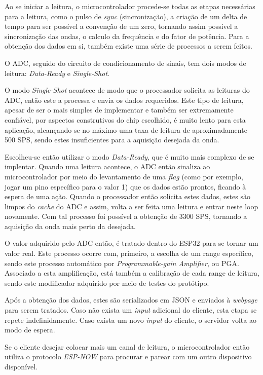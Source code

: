 Ao se iniciar a leitura, o microcontrolador procede-se todas as etapas necessárias para a leitura, como o pulso de \textit{sync} (sincronização), a criação de um delta de tempo para ser possível a convenção de um zero, tornando assim possível a sincronização das ondas, o calculo da frequência e do fator de potência. Para a obtenção dos dados em si, também existe uma série de processos a serem feitos.

O \gls{ADC}, seguido do circuito de condicionamento de sinais, tem dois modos de leitura: \textit{Data-Ready} e \textit{Single-Shot}.

O modo \textit{Single-Shot} acontece de modo que o processador solicita as leituras do \gls{ADC}, então este a processa e envia os dados requeridos. Este tipo de leitura, apesar de ser o mais simples de implementar e também ser extremamente confiável, por aspectos construtivos do chip escolhido, é muito lento para esta aplicação, alcançando-se no máximo uma taxa de leitura de aproximadamente 500 \gls{SPS}, sendo estes insuficientes para a aquisição desejada da onda.

Escolheu-se então utilizar o modo \textit{Data-Ready}, que é muito mais complexo de se implentar. Quando uma leitura acontece, o \gls{ADC} então sinaliza ao microcontrolador por meio do levantamento de uma \textit{flag} (como por exemplo, jogar um pino específico para o valor 1) que os dados estão prontos, ficando à espera de uma ação. Quando o processador então solicita estes dados, estes são limpos do \textit{cache} do \gls{ADC} e assim, volta a ser feita uma leitura e entrar neste loop novamente. Com tal processo foi possível a obtenção de 3300 \gls{SPS}, tornando a aquisição da onda mais perto da desejada.

O valor adquirido pelo ADC então, é tratado dentro do ESP32 para se tornar um valor real. Este processo ocorre com, primeiro, a escolha de um range específico, sendo este processo automático por \textit{Programmable-gain Amplifier}, ou \gls{PGA}. Associado a esta amplificação, está também a calibração de cada range de leitura, sendo este modificador adquirido por meio de testes do protótipo.

Após a obtenção dos dados, estes são serializados em JSON e enviados à \textit{webpage} para serem tratados. Caso não exista um \textit{input} adicional do cliente, esta etapa se repete indefinidamente. Caso exista um novo \textit{input} do cliente, o servidor volta ao modo de espera.

Se o cliente desejar colocar mais um canal de leitura, o microcontrolador então utiliza o protocolo \textit{ESP-NOW} para procurar e parear com um outro dispositivo disponível.

